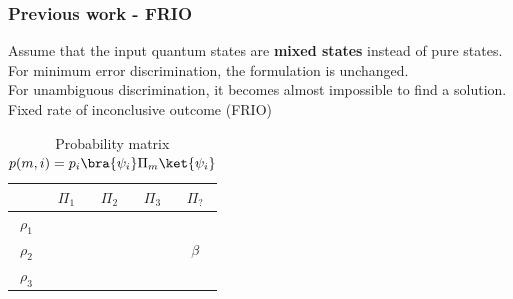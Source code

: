 \documentclass{beamer}
\begin{document}
\begin{frame}
    \frametitle{Previous work - FRIO}
    Assume that the input quantum states are \textbf{mixed states}
    instead of pure states.\\
    For minimum error discrimination, the formulation is unchanged.\\
    For unambiguous discrimination, it becomes almost impossible to find a
    solution.\\
    \vspace{0.2cm}
    \cite{RN37} Fixed rate of inconclusive outcome (FRIO)\\

    \begin{table}[ht]
        \begin{tabular}{c | c c c c}
                       & $\Pi_{1}$            & $\Pi_{2}$            & $\Pi_{3}$            & $\Pi_{?}$                      \\
            \hline
            $\rho_{1}$ & \cellcolor{green!20} & \cellcolor{red!20}   & \cellcolor{red!20}   & \cellcolor{yellow!30}          \\
            $\rho_{2}$ & \cellcolor{red!20}   & \cellcolor{green!20} & \cellcolor{red!20}   & \cellcolor{yellow!30}  $\beta$ \\
            $\rho_{3}$ & \cellcolor{red!20}   & \cellcolor{red!20}   & \cellcolor{green!20} & \cellcolor{yellow!30}          \\
        \end{tabular}
        \caption{Probability matrix $p(m,i) = p_{i} \bra{\psi_{i}} \Pi_{m} \ket{\psi_{i}}$}
    \end{table}
\end{frame}
\end{document}
